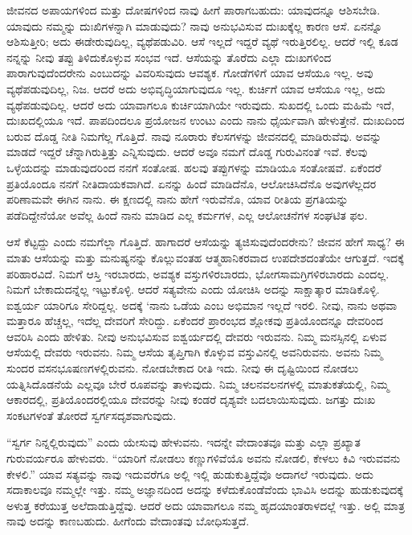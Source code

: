 ಜೀವನದ ಅಪಾಯಗಳಿಂದ ಮತ್ತು ದೋಷಗಳಿಂದ ನಾವು ಹೀಗೆ ಪಾರಾಗಬಹುದು: ಯಾವುದನ್ನೂ ಆಶಿಸಬೇಡಿ. ಯಾವುದು ನಮ್ಮನ್ನು ದುಃಖಿಗಳನ್ನಾಗಿ ಮಾಡುವುದು? ನಾವು ಅನುಭವಿಸುವ ದುಃಖಕ್ಕೆಲ್ಲ ಕಾರಣ ಆಸೆ. ಏನನ್ನೊ ಆಶಿಸುತ್ತೀರಿ; ಅದು ಈಡೇರುವುದಿಲ್ಲ, ವ್ಯಥೆಪಡುವಿರಿ. ಆಸೆ ಇಲ್ಲದೆ ಇದ್ದರೆ ವ್ಯಥೆ ಇರುತ್ತಿರಲಿಲ್ಲ. ಆದರೆ ಇಲ್ಲಿ ಕೂಡ ನನ್ನನ್ನು ನೀವು ತಪ್ಪು ತಿಳಿದುಕೊಳ್ಳುವ ಸಂಭವ ಇದೆ. ಆಸೆಯನ್ನು ತೊರೆದು ಎಲ್ಲಾ ದುಃಖಗಳಿಂದ ಪಾರಾಗುವುದೆಂದರೇನು ಎಂಬುದನ್ನು ವಿವರಿಸುವುದು ಆವಶ್ಯಕ. ಗೋಡೆಗಳಿಗೆ ಯಾವ ಆಸೆಯೂ ಇಲ್ಲ. ಅವು ವ್ಯಥೆಪಡುವುದಿಲ್ಲ, ನಿಜ. ಆದರೆ ಅದು ಅಭಿವೃದ್ಧಿಯಾಗುವುದೂ ಇಲ್ಲ. ಕುರ್ಚಿಗೆ ಯಾವ ಆಸೆಯೂ ಇಲ್ಲ, ಅದು ವ್ಯಥೆಪಡುವುದಿಲ್ಲ. ಆದರೆ ಅದು ಯಾವಾಗಲೂ ಕುರ್ಚಿಯಾಗಿಯೇ ಇರುವುದು. ಸುಖದಲ್ಲಿ ಒಂದು ಮಹಿಮೆ ಇದೆ, ದುಃಖದಲ್ಲಿಯೂ ಇದೆ. ಪಾಪದಿಂದಲೂ ಪ್ರಯೋಜನ ಉಂಟು ಎಂದು ನಾನು ಧೈರ್ಯವಾಗಿ ಹೇಳುತ್ತೇನೆ. ದುಃಖದಿಂದ ಬರುವ ದೊಡ್ಡ ನೀತಿ ನಿಮಗೆಲ್ಲ ಗೊತ್ತಿದೆ. ನಾವು ನೂರಾರು ಕೆಲಸಗಳನ್ನು ಜೀವನದಲ್ಲಿ ಮಾಡಿರುವೆವು. ಅವನ್ನು ಮಾಡದೆ ಇದ್ದರೆ ಚೆನ್ನಾಗಿರುತ್ತಿತ್ತು ಎನ್ನಿಸುವುದು. ಆದರೆ ಅವೂ ನಮಗೆ ದೊಡ್ಡ ಗುರುವಿನಂತೆ ಇವೆ. ಕೆಲವು ಒಳ್ಳೆಯದನ್ನು ಮಾಡುವುದರಿಂದ ನನಗೆ ಸಂತೋಷ. ಹಲವು ತಪ್ಪುಗಳನ್ನು ಮಾಡಿಯೂ ಸಂತೋಷವೆ. ಏಕೆಂದರೆ ಪ್ರತಿಯೊಂದೂ ನನಗೆ ನೀತಿದಾಯಕವಾಗಿದೆ. ಏನನ್ನು ಹಿಂದೆ ಮಾಡಿದೆನೊ, ಆಲೋಚಿಸಿದೆನೊ ಅವುಗಳೆಲ್ಲದರ ಪರಿಣಾಮವೇ ಈಗಿನ ನಾನು. ಈ ಕ್ಷಣದಲ್ಲಿ ನಾನು ಹೇಗೆ ಇರುವೆನೊ, ಯಾವ ರೀತಿಯ ಪ್ರಗತಿಯನ್ನು ಪಡೆದಿದ್ದೇನೆಯೋ ಅವೆಲ್ಲ ಹಿಂದೆ ನಾನು ಮಾಡಿದ ಎಲ್ಲ ಕರ್ಮಗಳ, ಎಲ್ಲ ಆಲೋಚನೆಗಳ ಸಂಘಟಿತ ಫಲ.

\vskip 0.2cm 

ಆಸೆ ಕೆಟ್ಟದ್ದು ಎಂದು ನಮಗೆಲ್ಲಾ ಗೊತ್ತಿದೆ. ಹಾಗಾದರೆ ಆಸೆಯನ್ನು ತ್ಯಜಿಸುವುದೆಂದರೇನು? ಜೀವನ ಹೇಗೆ ಸಾಧ್ಯ? ಈ ಮಾತು ಆಸೆಯನ್ನು ಮತ್ತು ಮನುಷ್ಯನನ್ನು ಕೊಲ್ಲುವಂತಹ ಆತ್ಮಹಾನಿಕರವಾದ ಉಪದೇಶದಂತೆಯೇ ಆಗುತ್ತದೆ. ಇದಕ್ಕೆ ಪರಿಹಾರವಿದೆ. ನಿಮಗೆ ಆಸ್ತಿ ಇರಬಾರದು, ಅವಶ್ಯಕ ವಸ್ತುಗಳಿರಬಾರದು, ಭೋಗಸಾಮಗ್ರಿಗಳಿರಬಾರದು ಎಂದಲ್ಲ. ನಿಮಗೆ ಬೇಕಾದುದನ್ನೆಲ್ಲ ಇಟ್ಟುಕೊಳ್ಳಿ. ಆದರೆ ಸತ್ಯವೇನು ಎಂದು ಯೋಚಿಸಿ ಅದನ್ನು ಸಾಕ್ಷಾತ್ಕಾರ ಮಾಡಿಕೊಳ್ಳಿ. ಐಶ್ವರ್ಯ ಯಾರಿಗೂ ಸೇರಿದ್ದಲ್ಲ. ಅದಕ್ಕೆ ‘ನಾನು ಒಡೆಯ ಎಂಬ ಅಭಿಮಾನ ಇಲ್ಲದೆ ಇರಲಿ. ನೀವು, ನಾನು ಅಥವಾ ಮತ್ತಾರೂ ಹೆಚ್ಚಲ್ಲ, ಇದೆಲ್ಲ ದೇವರಿಗೆ ಸೇರಿದ್ದು. ಏಕೆಂದರೆ ಪ್ರಾರಂಭದ ಶ್ಲೋಕವು ಪ್ರತಿಯೊಂದನ್ನೂ ದೇವರಿಂದ ಆವರಿಸಿ ಎಂದು ಹೇಳಿತು. ನೀವು ಅನುಭವಿಸುವ ಐಶ್ವರ್ಯದಲ್ಲಿ ದೇವರು ಇರುವನು. ನಿಮ್ಮ ಮನಸ್ಸಿನಲ್ಲಿ ಏಳುವ ಆಸೆಯಲ್ಲಿ ದೇವರು ಇರುವನು. ನಿಮ್ಮ ಆಸೆಯ ತೃಪ್ತಿಗಾಗಿ ಕೊಳ್ಳುವ ವಸ್ತುವಿನಲ್ಲಿ ಅವನಿರುವನು. ಅವನು ನಿಮ್ಮ ಸುಂದರ ವಸನಭೂಷಣಗಳಲ್ಲಿರುವನು. ನೋಡಬೇಕಾದ ರೀತಿ ಇದು. ನೀವು ಈ ದೃಷ್ಟಿಯಿಂದ ನೋಡಲು ಯತ್ನಿಸಿದೊಡನೆಯೆ ಎಲ್ಲವೂ ಬೇರೆ ರೂಪವನ್ನು ತಾಳುವುದು. ನಿಮ್ಮ ಚಲನವಲನಗಳಲ್ಲಿ ಮಾತುಕತೆಯಲ್ಲಿ, ನಿಮ್ಮ ಆಕಾರದಲ್ಲಿ, ಪ್ರತಿಯೊಂದರಲ್ಲಿಯೂ ದೇವರನ್ನು ನೀವು ಕಂಡರೆ ದೃಶ್ಯವೇ ಬದಲಾಯಿಸುವುದು. ಜಗತ್ತು ದುಃಖ ಸಂಕಟಗಳಂತೆ ತೋರದೆ ಸ್ವರ್ಗಸದೃಶವಾಗುವುದು.


“ಸ್ವರ್ಗ ನಿನ್ನಲ್ಲಿರುವುದು” ಎಂದು ಯೇಸುವು ಹೇಳುವನು. ಇದನ್ನೇ ವೇದಾಂತವೂ ಮತ್ತು ಎಲ್ಲಾ ಪ್ರಖ್ಯಾತ ಗುರುವರ್ಯರೂ ಹೇಳುವರು. “ಯಾರಿಗೆ ನೋಡಲು ಕಣ್ಣುಗಳಿವೆಯೊ ಅವನು ನೋಡಲಿ, ಕೇಳಲು ಕಿವಿ ಇರುವವನು ಕೇಳಲಿ.” ಯಾವ ಸತ್ಯವನ್ನು ನಾವು ಇದುವರೆಗೂ ಅಲ್ಲಿ ಇಲ್ಲಿ ಹುಡುಕುತ್ತಿದ್ದೆವೊ ಅದಾಗಲೆ ಇರುವುದು. ಅದು ಸದಾಕಾಲವೂ ನಮ್ಮಲ್ಲೇ ಇತ್ತು. ನಮ್ಮ ಅಜ್ಞಾನದಿಂದ ಅದನ್ನು ಕಳೆದುಕೊಂಡೆವೆಂದು ಭಾವಿಸಿ ಅದನ್ನು ಹುಡುಕುವುದಕ್ಕೆ ಅಳುತ್ತ ಕರೆಯುತ್ತ ಅಲೆದಾಡುತ್ತಿದ್ದೆವು. ಆದರೆ ಅದು ಯಾವಾಗಲೂ ನಮ್ಮ ಹೃದಯಾಂತರಾಳದಲ್ಲೆ ಇತ್ತು. ಅಲ್ಲಿ ಮಾತ್ರ ನಾವು ಅದನ್ನು ಕಾಣಬಹುದು. ಹೀಗೆಂದು ವೇದಾಂತವು ಬೋಧಿಸುತ್ತದೆ.

